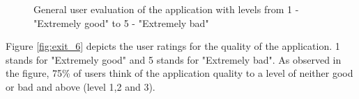 \begin{figure}[htp]
\hspace{1em}
\newline
\centering
{}
\caption{General user evaluation of the application with levels from 1 - "Extremely good" to 5 - "Extremely bad"}
\label{fig:st3}
\end{figure}

Figure \ref{fig:exit_6} depicts the user ratings for the quality of the application. 1 stands for "Extremely good" and 5 stands for "Extremely bad". As observed in the figure, 75\% of users think of the application quality to a level of neither good or bad and above (level 1,2 and 3).

